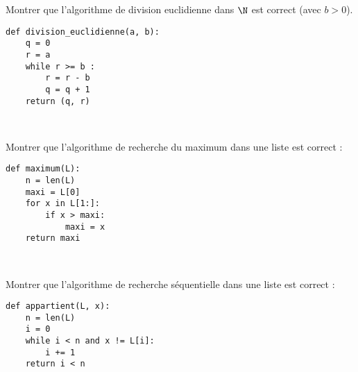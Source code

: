 \exercice{} Montrer que l'algorithme de division euclidienne dans $\N$ est correct (avec  $b>0$).

\begin{minipage}{0.5\linewidth} %
\begin{minipage}{0.9\linewidth}
\begin{lstlisting}
def division_euclidienne(a, b):
    q = 0
    r = a
    while r >= b :
        r = r - b
        q = q + 1
    return (q, r)
\end{lstlisting}
\end{minipage}\,
 
\end{minipage}%
\hfill 
\begin{minipage}{0.5\linewidth} 
\end{minipage}


\exercice{}

Montrer que l'algorithme de recherche du maximum dans une liste est correct :

\begin{minipage}{0.5\linewidth} %
\begin{minipage}{0.9\linewidth}
\begin{lstlisting}
def maximum(L):
    n = len(L)
    maxi = L[0]
    for x in L[1:]:
        if x > maxi: 
            maxi = x
    return maxi
\end{lstlisting}
\end{minipage}\,
 
\end{minipage}%
\hfill 
\begin{minipage}{0.5\linewidth} 
\end{minipage}

\eject
\exercice{}

Montrer que l'algorithme de recherche séquentielle dans une liste est correct :

\begin{minipage}{0.5\linewidth} %
\begin{minipage}{0.9\linewidth}
\begin{lstlisting}
def appartient(L, x):
    n = len(L)
    i = 0
    while i < n and x != L[i]:
        i += 1
    return i < n
\end{lstlisting}
\end{minipage}\,
 
\end{minipage}%
\hfill 
\begin{minipage}{0.5\linewidth} 
\end{minipage}

